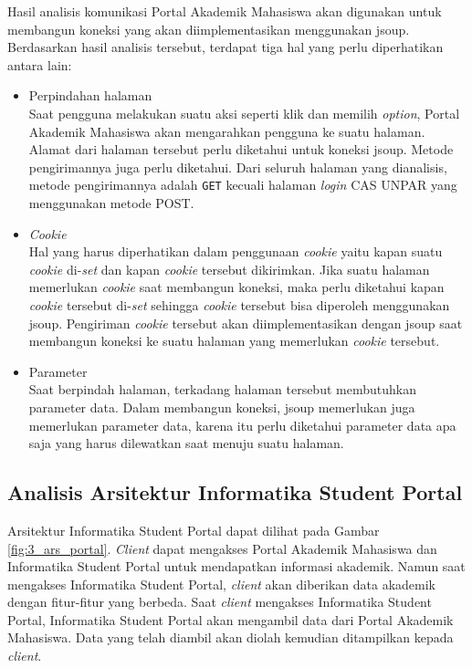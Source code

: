 Hasil analisis komunikasi Portal Akademik Mahasiswa akan digunakan untuk membangun koneksi yang akan diimplementasikan menggunakan jsoup. Berdasarkan hasil analisis tersebut, terdapat tiga hal yang perlu diperhatikan antara lain:
	\begin{itemize}
	\item Perpindahan halaman \\
		Saat pengguna melakukan suatu aksi seperti klik dan memilih \textit{option}, Portal Akademik Mahasiswa akan mengarahkan pengguna ke suatu halaman. Alamat dari halaman tersebut perlu diketahui untuk koneksi jsoup. Metode pengirimannya juga perlu diketahui. Dari seluruh halaman yang dianalisis, metode pengirimannya adalah \texttt{GET} kecuali halaman \textit{login} CAS UNPAR yang menggunakan metode POST.
	\item\textit{Cookie} \\
		Hal yang harus diperhatikan dalam penggunaan \textit{cookie} yaitu kapan suatu \textit{cookie} di-\textit{set} dan kapan \textit{cookie} tersebut dikirimkan. Jika suatu halaman memerlukan \textit{cookie} saat membangun koneksi, maka perlu diketahui kapan \textit{cookie} tersebut di-\textit{set} sehingga \textit{cookie} tersebut bisa diperoleh menggunakan jsoup. Pengiriman \textit{cookie} tersebut akan diimplementasikan dengan jsoup saat membangun koneksi ke suatu halaman yang memerlukan \textit{cookie} tersebut.
	\item Parameter\\
	Saat berpindah halaman, terkadang halaman tersebut membutuhkan parameter data. Dalam membangun koneksi, jsoup memerlukan juga memerlukan parameter data, karena itu perlu diketahui parameter data apa saja yang harus dilewatkan saat menuju suatu halaman.
\end{itemize}

\subsection{Analisis Arsitektur Informatika Student Portal}
Arsitektur Informatika Student Portal dapat dilihat pada Gambar \ref{fig:3_ars_portal}. \textit{Client} dapat mengakses Portal Akademik Mahasiswa dan Informatika Student Portal untuk mendapatkan informasi akademik. Namun saat mengakses Informatika Student Portal, \textit{client} akan diberikan data akademik dengan fitur-fitur yang berbeda. Saat \textit{client} mengakses Informatika Student Portal, Informatika Student Portal akan mengambil data dari Portal Akademik Mahasiswa. Data yang telah diambil akan diolah kemudian ditampilkan kepada \textit{client}.

